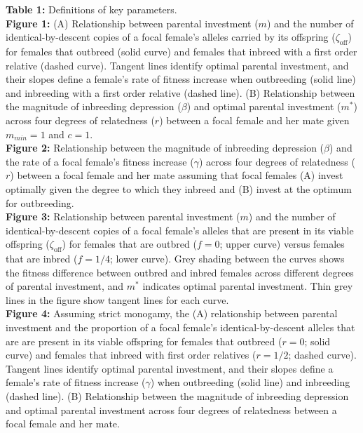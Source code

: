\documentclass[12pt]{article}
\begin{document}



\clearpage

\noindent \textbf{Table 1:}  Definitions of key parameters. \\

\noindent \textbf{Figure 1:} (A) Relationship between parental investment ($m$) and the number of identical-by-descent copies of a focal female's alleles carried by its offspring ($\zeta_{\textrm{off}}$) for females that outbreed (solid curve) and females that inbreed with a first order relative (dashed curve). Tangent lines identify optimal parental investment, and their slopes define a female's rate of fitness increase when outbreeding (solid line) and inbreeding with a first order relative (dashed line). (B) Relationship between the magnitude of inbreeding depression ($\beta$) and optimal parental investment ($m^{*}$) across four degrees of relatedness ($r$) between a focal female and her mate given $m_{min}=1$ and $c=1$. \\ 

\noindent \textbf{Figure 2:} Relationship between the magnitude of inbreeding depression ($\beta$) and the rate of a focal female's fitness increase ($\gamma$) across four degrees of relatedness ($r$) between a focal female and her mate assuming that focal females (A) invest optimally given the degree to which they inbreed and (B) invest at the optimum for outbreeding. \\

\noindent \textbf{Figure 3:} Relationship between parental investment ($m$) and the number of identical-by-descent copies of a focal female's alleles that are present in its viable offspring ($\zeta_{\textrm{off}}$) for females that are outbred ($f=0$; upper curve) versus females that are inbred ($f=1/4$; lower curve). Grey shading between the curves shows the fitness difference between outbred and inbred females across different degrees of parental investment, and $m^{*}$ indicates optimal parental investment. Thin grey lines in the figure show tangent lines for each curve. \\

\noindent \textbf{Figure 4:} Assuming strict monogamy, the (A) relationship between parental investment and the proportion of a focal female's identical-by-descent alleles that are are present in its viable offspring for females that outbreed ($r=0$; solid curve) and females that inbreed with first order relatives ($r=1/2$; dashed curve). Tangent lines identify optimal parental investment, and their slopes define a female's rate of fitness increase ($\gamma$) when outbreeding (solid line) and inbreeding (dashed line). (B) Relationship between the magnitude of inbreeding depression and optimal parental investment across four degrees of relatedness between a focal female and her mate. \\
\end{document}
